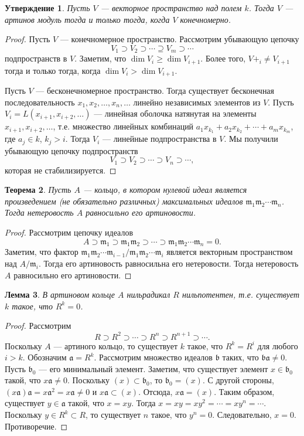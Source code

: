 \documentclass[12pt, titlepage, oneside]{amsbook}
\newcommand{\aaa}{\mathfrak{a}}
\newcommand{\bbb}{\mathfrak{b}}
\newcommand{\mmm}{\mathfrak{m}}
\newtheorem{theorem}{Теорема}[chapter]
\newtheorem{lemma}[theorem]{Лемма}
\newtheorem{claim}[theorem]{Утверждение}
\theoremstyle{definition}
\theoremstyle{remark}
\begin{document}
\begin{claim}
	\label{Art6}
	Пусть $V$ --- векторное пространство над полем $k$. Тогда $V$ --- артинов модуль тогда и только тогда, когда $V$ конечномерно.
\end{claim}

\begin{proof}
	Пусть $V$ --- конечномерное пространство. Рассмотрим убывающую цепочку $$V_1\supset V_2\supset\cdots\supseteq V_m\supset\cdots$$ подпространств в $V$. Заметим, что $\dim V_i\geq\dim V_{i+1}$. Более того, $V+_i\neq V_{i+1}$ тогда и только тогда, когда $\dim V_i>\dim V_{i+1}$.
	
	Пусть $V$ --- бесконечномерное пространство. Тогда существует бесконечная последовательность $x_1,x_2,\ldots,x_n,\ldots$ линейно независимых элементов из $V$. Пусть $V_i=L(x_{i+1},x_{i+2},\ldots)$ --- линейная оболочка натянутая на элементы $x_{i+1},x_{i+2},\ldots$, т.е. множество линейных комбинаций $a_1x_{k_1}+a_2x_{k_2}+\cdots+a_mx_{k_m}$, где $a_j\in k$, $k_j>i$. Тогда $V_i$ --- линейные подпространства в $V$. Мы получили убывающую цепочку подпространств $$V_1\supset V_2\supset\cdots\supset V_n\supset\cdots,$$ которая не стабилизируется.
\end{proof}


\begin{theorem}
	\label{Art7}
	Пусть $A$ --- кольцо, в котором нулевой идеал является произведением (не обязательно различных) максимальных идеалов $\mmm_1\mmm_2\cdots\mmm_n$. Тогда нетеровость $A$ равносильно его артиновости.
\end{theorem}

\begin{proof}
	Рассмотрим цепочку идеалов $$A\supset\mmm_1\supset\mmm_1\mmm_2\supset\cdots\supset\mmm_1\mmm_2\cdots\mmm_n=0.$$ Заметим, что фактор $\mmm_1\mmm_2\cdots\mmm_{i-1}/\mmm_1\mmm_2\cdots\mmm_{i}$ является векторным пространством над $A/\mmm_i$. Тогда его артиновость равносильна его нетеровости. Тогда нетеровость $A$ равносильно его артиновости.
\end{proof}

\begin{lemma}
	\label{ArtL2}
	В артиновом кольце $A$ нильрадикал $R$ нильпотентен, т.е. существует $k$ такое, что $R^k=0$.
\end{lemma}

\begin{proof}
	Рассмотрим $$R\supset R^2\supset\cdots\supset R^n\supset R^{n+1}\supset\cdots.$$ Поскольку $A$ --- артиного кольцо, то существует $k$ такое, что $R^k=R^i$ для любого $i>k$. Обозначим $\aaa=R^k$. Рассмотрим множество идеалов $\bbb$ таких, что $\bbb\aaa\neq 0$. Пусть $\bbb_0$ --- его минимальный элемент. Заметим, что существует элемент $x\in\bbb_0$ такой, что $x\aaa\neq 0$. Поскольку $(x)\subset\bbb_0$, то $\bbb_0=(x)$. С другой стороны, $(x\aaa)\aaa=x\aaa^2=x\aaa\neq 0$ и $x\aaa\subset (x)$. Отсюда, $x\aaa=(x)$. Таким образом, существует $y\in\aaa$ такой, что $x=xy$. Тогда $x=xy=xy^2=\cdots=xy^n=\cdots$. Поскольку $y\in R^k\subset R$, то существует $n$ такое, что $y^n=0$. Следовательно, $x=0$. Противоречие.
\end{proof}
\end{document}
